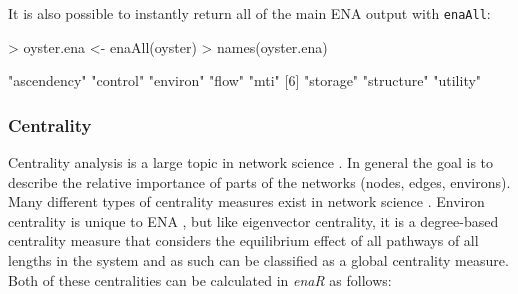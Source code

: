 \documentclass[article]{jss}
\begin{document}
It is also possible to instantly return all of the main ENA output
with \texttt{enaAll}:

\begin{Schunk}
\begin{Sinput}
> oyster.ena <- enaAll(oyster)
> names(oyster.ena)
\end{Sinput}
\begin{Soutput}
[1] "ascendency" "control"    "environ"    "flow"       "mti"       
[6] "storage"    "structure"  "utility"   
\end{Soutput}
\end{Schunk}

\subsubsection{Centrality}
Centrality analysis is a large topic in network science
\cite{brandes05, wasserman1994}.  In general the goal is to describe the
relative importance of parts of the networks (nodes, edges,
environs). Many different types of centrality measures exist in
network science \cite{freeman79, freeman1991centrality, borgatti06,
  brandes05}.  Environ centrality is unique to ENA
\cite{fann12_ec}, but like eigenvector centrality, it is a degree-based
centrality measure that considers the equilibrium effect of all
pathways of all lengths in the system and as such can be classified as
a global centrality measure.   Both of these
centralities can be calculated in \textit{enaR} as follows:

\begin{Schunk}
\end{Schunk}
\end{document}
